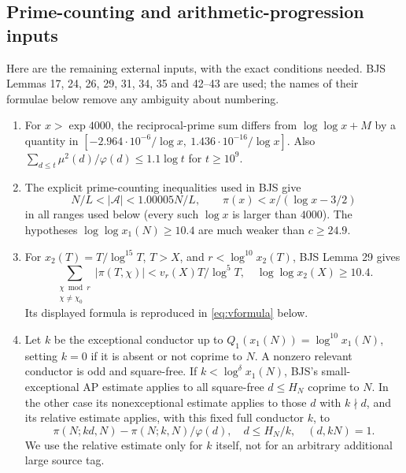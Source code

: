 \documentclass[11pt]{article}
\theoremstyle{definition}
\newcommand{\A}{\mathcal A}
\begin{document}
\subsection{Prime-counting and arithmetic-progression inputs}

Here are the remaining external inputs, with the exact conditions needed.
BJS Lemmas 17, 24, 26, 29, 31, 34, 35 and 42--43 are used; the names
of their formulae below remove any ambiguity about numbering.
\begin{enumerate}
\item For $x>\exp4000$, the reciprocal-prime sum differs from
$\log\log x+M$ by a quantity in
$[-2.964\cdot10^{-6}/\log x,\ 1.436\cdot10^{-16}/\log x]$.
Also $\sum_{d\le t}\mu^2(d)/\varphi(d)\le1.1\log t$ for $t\ge10^9$.
\item The explicit prime-counting inequalities used in BJS give
\begin{equation}\label{eq:A-mass}
 N/L<|\A|<1.00005N/L,
 \qquad \pi(x)<x/(\log x-3/2)
\end{equation}
in all ranges used below (every such $\log x$ is larger than $4000$).
The hypotheses $\log\log x_1(N)\ge10.4$ are much weaker than $c\ge24.9$.
\item For $x_2(T)=T/\log^{15}T$, $T>X$, and
$r<\log^{10}x_2(T)$, BJS Lemma 29 gives
\begin{equation}\label{eq:chi-prime}
 \sum_{\substack{\chi\bmod r\\\chi\ne\chi_0}}|\pi(T,\chi)|
 <v_r(X)T/\log^5T,
 \quad \log\log x_2(X)\ge10.4.
\end{equation}
Its displayed formula is reproduced in \cref{eq:vformula} below.
\item Let $k$ be the exceptional conductor up to
$Q_1(x_1(N))=\log^{10}x_1(N)$, setting $k=0$ if it is absent or not
coprime to $N$.  A nonzero relevant conductor is odd and square-free.
If $k<\log^\delta x_1(N)$, BJS's small-exceptional AP estimate applies
to all square-free $d\le H_N$ coprime to $N$.  In the other case its
nonexceptional estimate applies to those $d$ with $k\nmid d$, and its
relative estimate applies, with this fixed full conductor $k$, to
\[
 \pi(N;kd,N)-\pi(N;k,N)/\varphi(d),\quad
 d\le H_N/k,\quad(d,kN)=1.
\]
We use the relative estimate only for $k$ itself, not for an arbitrary
additional large source tag.
\end{enumerate}
\end{document}
